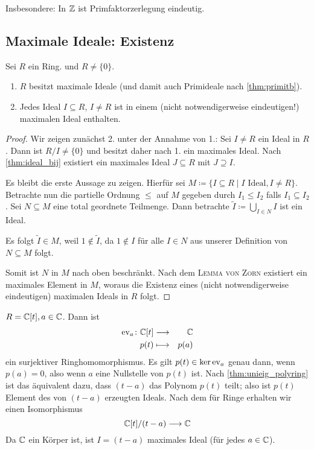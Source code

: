 \documentclass[12pt,a4paper]{scrartcl}
\begin{document}
\begin{bem}
	Insbesondere: In $\mathbb Z$ ist Primfaktorzerlegung \glqq eindeutig\grqq.
\end{bem}

\subsection{Maximale Ideale: Existenz}
\begin{satz}\label{thm:max_ideal_ex}
	Sei $R$ ein Ring.
	und $R \neq \{0\}$.
	\begin{enumerate}
		\item $R$ besitzt maximale Ideale \textup(und damit auch Primideale nach \cref{thm:primitb}\textup).
		\item Jedes Ideal $I\subseteq R$, $I \neq R$ ist in einem \textup(nicht notwendigerweise eindeutigen!\textup) maximalen Ideal enthalten.
	\end{enumerate}
\end{satz}
\begin{proof}
	Wir zeigen zunächst 2. unter der Annahme von 1.: Sei $I\neq R$ ein Ideal in $R$. Dann ist $R/I \neq \{0\}$  und besitzt daher nach 1. ein maximales Ideal. Nach \cref{thm:ideal_bij} existiert ein maximales Ideal $J\subseteq R$ mit $J\supseteq I$.
	
	
	Es bleibt die erste Aussage zu zeigen. Hierfür sei $M \coloneqq \{I\subseteq R\mid I\text{ Ideal}, I \neq R\}$. Betrachte nun die partielle Ordnung $\leq$ auf $M$ gegeben durch $I_1\leq I_2$ falls $I_1\subseteq I_2$. Sei $N\subseteq M$ eine total geordnete Teilmenge. Dann betrachte $\tilde{I} \coloneqq \bigcup\limits_{I\in N} I$ ist ein Ideal.
	
	Es folgt $\tilde{I}\in M$, weil $1\notin \tilde{I}$, da $1\notin I$ für alle $ I\in N$ aus unserer Definition von $N\subseteq M$ folgt.
	
	Somit ist $N$ in $M$ nach oben beschränkt. Nach dem \textsc{Lemma von Zorn} existiert ein maximales Element in $M$, woraus die Existenz eines (nicht notwendigerweise eindeutigen) maximalen Ideals in $R$ folgt.
\end{proof}
\begin{bsp}
	$R = \mathbb C[t], a\in \mathbb C$. Dann ist
	\begin{eqnarray*}
		\operatorname{ev}_a\colon \mathbb C[t] & \longrightarrow & \mathbb C\\
		p(t) & \longmapsto & p(a)
	\end{eqnarray*}
	ein surjektiver Ringhomomorphismus. Es gilt $p(t) \in \operatorname{ker}\operatorname{ev}_a$ genau dann, wenn $p(a) = 0$, also wenn $a$ eine Nullstelle von $p(t)$ ist. Nach \cref{thm:unieig_polyring} ist das äquivalent dazu, dass $(t-a)$ das Polynom $p(t)$ teilt; also ist $p(t)$ Element des von $(t-a)$ erzeugten Ideals. Nach dem  für Ringe erhalten wir einen Isomorphismus
	$$ \mathbb C[t]/(t-a) \longrightarrow \mathbb C$$
	Da $\mathbb C$ ein Körper ist, ist $I = (t-a)$ maximales Ideal (für jedes $a\in \mathbb C$).
\end{bsp}
\end{document}
